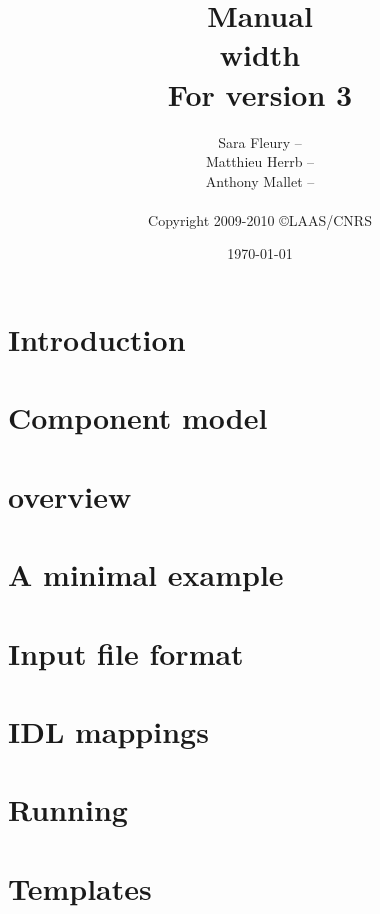 \documentclass[a4paper,11pt]{book}
\title{{\Huge\bfseries \GenoM{} Manual}\\ \vrule height 2pt width \linewidth\\
         \hfill\small For \GenoM{} version 3}
\author{
   Sara Fleury -- {\email{sara.fleury@laas.fr}}\\
   Matthieu Herrb -- {\email{matthieu.herrb@laas.fr}}\\
   Anthony Mallet -- {\email{anthony.mallet@laas.fr}}\\
   \hfill\\
   Copyright 2009-2010 \copyright LAAS/CNRS
}
\date{\today}
\begin{document}

\frontmatter
\maketitle
\tableofcontents
\mainmatter

\chapter{Introduction}

\chapter{Component model}
\label{chapter:model}

\chapter{\GenoM{} overview}
\label{chapter:genom}

\chapter{A minimal example}

\chapter{Input file format}
\label{chapter:iff}


\chapter{\GenoM{} IDL mappings}
\label{chapter:mappings}

\chapter{Running \GenoM{}}
\label{chapter:run}


\chapter{Templates}
\label{chapter:tmpl}


\backmatter

\printindex
\end{document}
